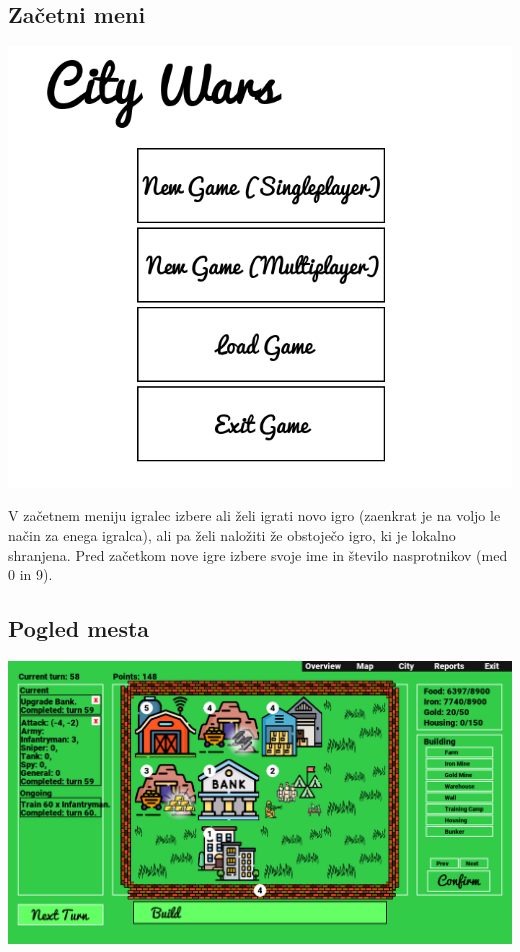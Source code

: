 \documentclass[a4paper, 16pt]{article}
\begin{document}
\subsection{Začetni meni}

\includegraphics[width=\textwidth]{1.png}

V začetnem meniju igralec izbere ali želi igrati novo igro (zaenkrat je na voljo le način za enega igralca), ali pa želi naložiti že obstoječo igro, ki je lokalno shranjena.
Pred začetkom nove igre izbere svoje ime in število nasprotnikov (med 0 in 9). 

\subsection{Pogled mesta}

\includegraphics[width=\textwidth]{2.png}
\end{document}
